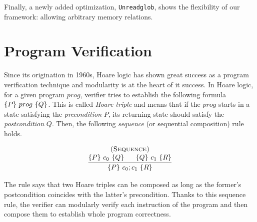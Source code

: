 Finally, a newly added optimization, \texttt{Unreadglob}, shows the flexibility of our framework:
allowing arbitrary memory relations.





\section{Program Verification}\label{sec:overview:program}




Since its origination in 1960s, Hoare logic has shown great success as a program verification technique and modularity is at the heart of it success.
In Hoare logic, for a given program $prog$, verifier tries to establish the following formula $\{{P}\}~{prog}~\{{Q}\}$.
This is called {\it Hoare triple} and means that if the $prog$ starts in a state satisfying the {\it precondition} $P$,
its returning state should satisfy the {\it postcondition} $Q$.
Then, the following {\it sequence} (or sequential composition) rule holds.

\[
\infer
    {\hoare{P}{c_{0} ; c_{1}}{R}}
    {\deduce{\hoare{P}{c_{0}}{Q} \;\;\;\;\;\; \hoare{Q}{c_{1}}{R}}
      {\textsc{(Sequence)}}}
\]

\noindent The rule says that two Hoare triples can be composed as long as the former's postcondition coincides with the latter's precondition. Thanks to this sequence rule, the verifier can modularly verify each instruction of the program and then compose them to establish whole program correctness.



